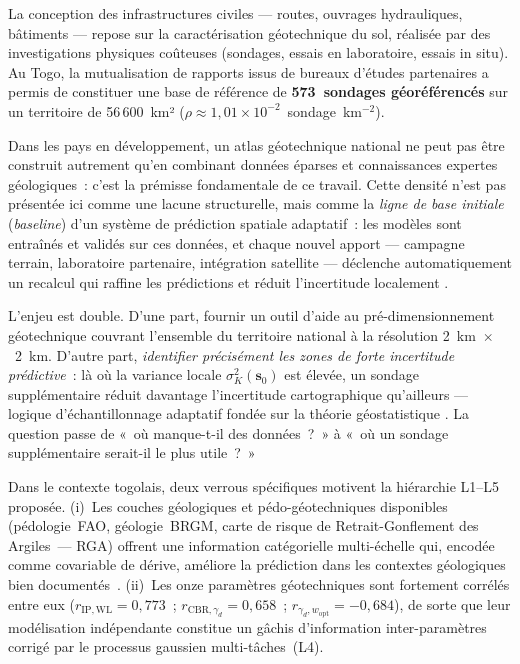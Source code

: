 \documentclass[10pt,a4paper,twocolumn]{article}
\newcommand{\bs}{\mathbf{s}}
\begin{document}
	La conception des infrastructures civiles --- routes, ouvrages hydrauliques,
	bâtiments --- repose sur la caractérisation géotechnique du sol, réalisée
	par des investigations physiques coûteuses (sondages, essais en laboratoire,
	essais in situ). Au Togo, la mutualisation de rapports issus de bureaux
	d'études partenaires a permis de constituer une base de référence de
	\textbf{573~sondages géoréférencés} sur un territoire de
	56\,600~km² ($\rho \approx 1{,}01\times10^{-2}$~sondage~km$^{-2}$).
	
	Dans les pays en développement, un atlas géotechnique national ne peut
	pas être construit autrement qu'en combinant données éparses et
	connaissances expertes géologiques~: c'est la prémisse fondamentale
	de ce travail.
	Cette densité n'est pas présentée ici comme une lacune structurelle, mais
	comme la \emph{ligne de base initiale} (\textit{baseline}) d'un système
	de prédiction spatiale adaptatif~: les modèles sont entraînés et validés
	sur ces données, et chaque nouvel apport --- campagne terrain, laboratoire
	partenaire, intégration satellite --- déclenche automatiquement un recalcul
	qui raffine les prédictions et réduit l'incertitude localement
	\cite{mcbratney2003digital,brus2007sampling}.
	
	L'enjeu est double. D'une part, fournir un outil d'aide au
	pré-dimensionnement géotechnique couvrant l'ensemble du territoire national
	à la résolution 2~km~$\times$~2~km. D'autre part, \emph{identifier
		précisément les zones de forte incertitude prédictive}~: là où la variance
	locale $\sigma^2_K(\bs_0)$ est élevée, un sondage supplémentaire réduit
	davantage l'incertitude cartographique qu'ailleurs --- logique
	d'échantillonnage adaptatif fondée sur la théorie géostatistique
	\cite{brus2007sampling}. La question passe de
	«~où manque-t-il des données~?~» à
	«~où un sondage supplémentaire serait-il le plus utile~?~»
	
	Dans le contexte togolais, deux verrous spécifiques motivent la
	hiérarchie L1--L5 proposée.
	(i)~Les couches géologiques et pédo-géotechniques disponibles
	(pédologie~FAO, géologie~BRGM, carte de risque de Retrait-Gonflement
	des Argiles~--- RGA) offrent une information catégorielle multi-échelle
	qui, encodée comme covariable de dérive, améliore la prédiction dans
	les contextes géologiques bien documentés~\cite{odeh1994further}.
	(ii)~Les onze paramètres géotechniques sont fortement corrélés entre eux
	($r_{\mathrm{IP,WL}}=0{,}773$~; $r_{\mathrm{CBR},\gamma_d}=0{,}658$~;
	$r_{\gamma_d,w_{\mathrm{opt}}}=-0{,}684$), de sorte que leur modélisation
	indépendante constitue un gâchis d'information inter-paramètres corrigé
	par le processus gaussien multi-tâches~(L4).
	
\end{document}
